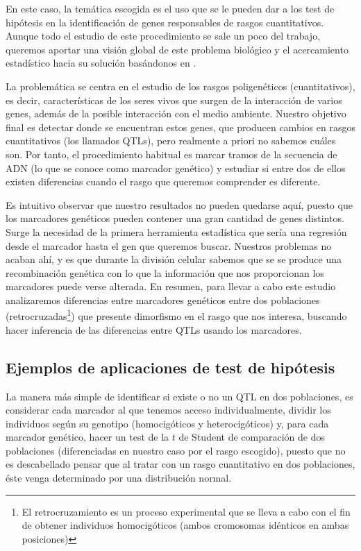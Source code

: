 \documentclass[a4paper,12pt]{article}
\begin{document}
En este caso, la temática escogida es el uso que se le pueden dar a los test de hipótesis en la identificación de genes responsables de rasgos cuantitativos. Aunque todo el estudio de este procedimiento se sale un poco del trabajo, queremos aportar una visión global de este problema biológico y el acercamiento estadístico hacia su solución basándonos en \cite{uned2}.

La problemática se centra en el estudio de los rasgos poligenéticos (cuantitativos), es decir, características de los seres vivos que surgen de la interacción de varios genes, además de la posible interacción con el medio ambiente. 
Nuestro objetivo final es detectar donde se encuentran estos genes, que producen cambios en rasgos cuantitativos (los llamados QTLs), pero realmente a priori no sabemos cuáles son. Por tanto, el procedimiento habitual es marcar tramos de la secuencia de ADN (lo que se conoce como marcador genético) y estudiar si entre dos de ellos existen diferencias cuando el rasgo que queremos comprender es diferente. 

Es intuitivo observar que nuestro resultados no pueden quedarse aquí, puesto que los marcadores genéticos pueden contener una gran cantidad de genes distintos. Surge la necesidad de la primera herramienta estadística que sería una regresión desde el marcador hasta el gen que queremos buscar. Nuestros problemas no acaban ahí, y es que durante la división celular sabemos que se se produce una recombinación genética con lo que la información que nos proporcionan los marcadores puede verse alterada. 
En resumen, para llevar a cabo este estudio analizaremos diferencias entre marcadores genéticos entre dos poblaciones (retrocruzadas\footnote{El retrocruzamiento es un proceso experimental que se lleva a cabo con el fin de obtener individuos homocigóticos (ambos cromosomas idénticos en ambas posiciones)}) que presente dimorfismo en el rasgo que nos interesa, buscando hacer inferencia de las diferencias entre QTLs usando los marcadores.

\subsection{Ejemplos de aplicaciones de test de hipótesis}
La manera más simple de identificar si existe o no un QTL en dos poblaciones, es considerar cada marcador al que tenemos acceso individualmente, dividir los individuos según su genotipo (homocigóticos y heterocigóticos) y, para cada marcador genético, hacer un test de la $t$ de Student de comparación de dos poblaciones (diferenciadas en nuestro caso por el rasgo escogido), puesto que no es descabellado pensar que al tratar con un rasgo cuantitativo en dos poblaciones, éste venga determinado por una distribución normal.
\end{document}
